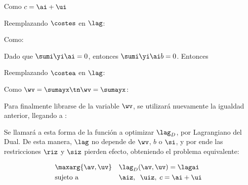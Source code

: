 Como $c = \ai+\ui$


Reemplazando $\costes$ en $\lag$:

\ma{
  \lag 
= \costew + \sumi \ai \si + \costeu  - \costea - \costeu \nonumber \\
= \costew + \sumi \ai \si - \costea
}


Como:

Dado que $\sumi \yi \ai =0$, entonces $\sumi  \yi \ai b =0$. Entonces


\ma{
  \costea
= \sumi(\wv \cdot \xi) \yi \ai + \sumi \si \ai - \sumi \ai
}

Reemplazando $\costea$ en $\lag$:

\ma{
  \lag 
&= \costew + \sumi \ai \si - \costea \\
&= \costew + \sumi \ai \si - (\sumi(\wv \cdot \xi) \yi \ai + \sumi \si \ai - \sumi \ai)\\
&= \costew + \sumi \ai \si - \sumi(\wv \cdot \xi) \yi \ai - \sumi \si \ai + \sumi \ai \\
&= \costew  - \sumi(\wv \cdot \xi) \yi \ai + \sumi \ai \\
&= \costew  - \wv \cdot \sumayx + \sumi \ai
}

Como $\wv = \sumayx \tn \wv= \sumayx$:

\ma{
  \lag 
&= \costew  - \wv \cdot \sumayx + \sumi \ai \\
&= \costew  - \wv \cdot \wv + \sumi \ai \\
&=  - \costew   + \sumi \ai
}

Para finalmente librarse de la variable $\wv$, se utilizará nuevamente la igualdad anterior, llegando a :


Se llamará a esta forma de la función a optimizar $\lag_D$, por Lagrangiano del Dual. De esta manera, $\lag$ no depende de $\wv$, $b$ o $\si$, y por ende las restricciones $\riz$ y $\siz$ pierden efecto, obteniendo el problema equivalente:


\begin{equation*}
\begin{aligned}
&  \maxarg{\av,\uv}
& & \lag_D(\av,\uv)= \lagai \\
& \text{sujeto a}
& & \aiz, \;\;  \uiz, \;  c = \ai+\ui 
\end{aligned}
\end{equation*}

